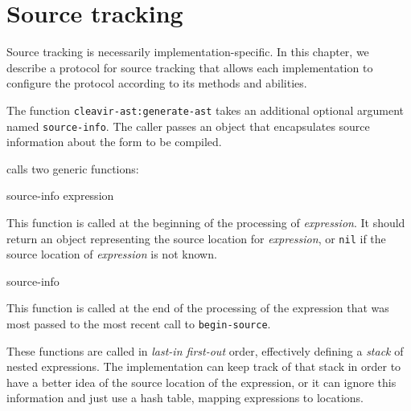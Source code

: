 \chapter{Source tracking}

Source tracking is necessarily implementation-specific.  In this
chapter, we describe a protocol for source tracking that allows each
implementation to configure the protocol according to its methods and
abilities.

The function \texttt{cleavir-ast:generate-ast} takes an additional
optional argument named \texttt{source-info}.  The caller passes an
object that encapsulates source information about the form to be
compiled.

\sysname{} calls two generic functions:

 {source-info expression}

This function is called at the beginning of the processing of
\textit{expression}.  It should return an object representing the
source location for \textit{expression}, or \texttt{nil} if the source
location of \textit{expression} is not known.

 {source-info}

This function is called at the end of the processing of the expression
that was most passed to the most recent call to
\texttt{begin-source}.

These functions are called in \emph{last-in first-out} order,
effectively defining a \emph{stack} of nested expressions.  The
implementation can keep track of that stack in order to have a better
idea of the source location of the expression, or it can ignore this
information and just use a hash table, mapping expressions to
locations.
